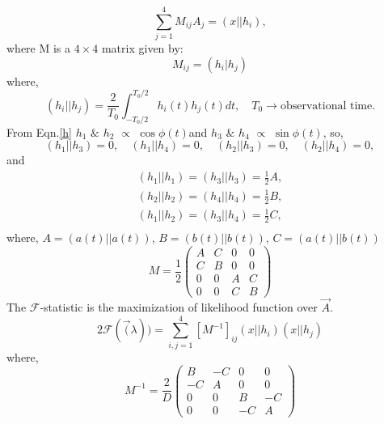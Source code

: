 \documentclass{ttuthes2007}
\begin{document}
\begin{equation}
\sum_{j=1}^4M_{ij}A_j =(x||h_i),
\end{equation}
where M is a $4 \times 4$ matrix given by:
\begin{equation}
M_{ij} = (h_i|h_j)
\end{equation}
where,
\begin{equation}
(h_i||h_j)=\frac{2}{T_0}\int_{-T_0/2}^{T_0/2}h_i(t)h_j(t)dt, \quad
T_0 \rightarrow \text{observational time.}
\end{equation}
From Eqn.\ref{h} $h_1$ $\&$ $h_2$ $\propto$ $\cos{\phi(t)}$\quad and $h_3$ $\&$ $h_4$
$\propto$ $\sin{\phi(t)}$, so,
\begin{equation}
(h_1||h_3)=0, \quad (h_1||h_4)=0, \quad (h_2||h_3)=0, \quad (h_2||h_4)=0,  
\end{equation}
and
\begin{equation}
\begin{split}
(h_1||h_1)=(h_3||h_3)=\frac{1}{2}A,\\
(h_2||h_2)=(h_4||h_4)=\frac{1}{2}B,\\
(h_1||h_2)=(h_3||h_4)=\frac{1}{2}C,\\
\end{split}
\end{equation}
where, $A=(a(t)||a(t))$, \quad  $B=(b(t)||b(t))$, \quad  $C=(a(t)||b(t))$ 
\begin{equation*}
M=\frac{1}{2}
\begin{pmatrix}
A & C & 0 & 0\\
C & B & 0 & 0\\
0 & 0 & A & C\\
0 & 0 & C & B
\end{pmatrix}
\end{equation*}
The $\mathcal{F}$-statistic is the maximization of likelihood function over
$\vec{A}$. 
\begin{equation}
2\mathcal{F}(\vec(\lambda))=\sum_{i,j=1}^{4}[M^{-1}]_{ij}(x||h_i)(x||h_j)
\end{equation}
where,
\begin{equation*}                                                               
M^{-1}=\frac{2}{D}                                                                   
\begin{pmatrix}                                                                 
B & -C & 0 & 0\\                                                                 
-C & A & 0 & 0\\                                                                 
0 & 0 & B & -C\\                                                                 
0 & 0 & -C & A                                                                   
\end{pmatrix}                                                                   
\end{equation*} 
\end{document}
